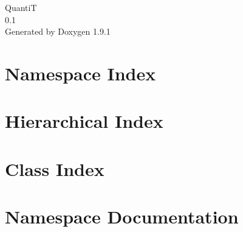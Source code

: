 \let\mypdfximage\pdfximage\def\pdfximage{\immediate\mypdfximage}\documentclass[twoside]{book}
\newcommand{\+}{\discretionary{\mbox{\scriptsize$\hookleftarrow$}}{}{}}
\newcommand{\clearemptydoublepage}{%
  \newpage{\pagestyle{empty}\cleardoublepage}%
}
\begin{document}
\raggedbottom

\hypersetup{pageanchor=false,
             bookmarksnumbered=true,
             pdfencoding=unicode
            }
\begin{titlepage}
\vspace*{7cm}
\begin{center}%
{\Large QuantiT \\[1ex]\large 0.\+1 }\\
\vspace*{1cm}
{\large Generated by Doxygen 1.9.1}\\
\end{center}
\end{titlepage}
\clearemptydoublepage
{}
\tableofcontents
\clearemptydoublepage
{}
\hypersetup{pageanchor=true}

\chapter{Namespace Index}

\chapter{Hierarchical Index}

\chapter{Class Index}

\chapter{Namespace Documentation}

\end{document}
